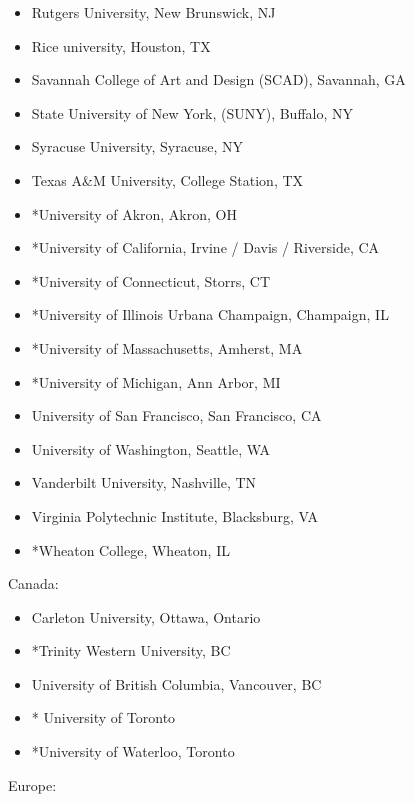 \begin{itemize}
\item Rutgers University, New Brunswick, NJ
\item Rice university, Houston, TX
\item Savannah College of Art and Design (SCAD), Savannah, GA
\item State University of New York, (SUNY), Buffalo, NY
\item Syracuse University, Syracuse, NY
\item Texas A\&M University, College Station, TX
\item *University of Akron, Akron, OH
\item *University of California, Irvine / Davis / Riverside, CA
\item *University of Connecticut, Storrs, CT
\item *University of Illinois Urbana Champaign, Champaign, IL
\item *University of Massachusetts, Amherst, MA
\item *University of Michigan, Ann Arbor, MI
\item University of San Francisco, San Francisco, CA
\item University of Washington, Seattle, WA
\item Vanderbilt University, Nashville, TN
\item Virginia Polytechnic Institute, Blacksburg, VA
\item *Wheaton College, Wheaton, IL
\end{itemize}


Canada:

\begin{itemize}
\item Carleton University, Ottawa, Ontario
\item *Trinity Western University, BC
\item University of British Columbia, Vancouver, BC
\item * University of Toronto
\item *University of Waterloo, Toronto
\end{itemize}


Europe:

